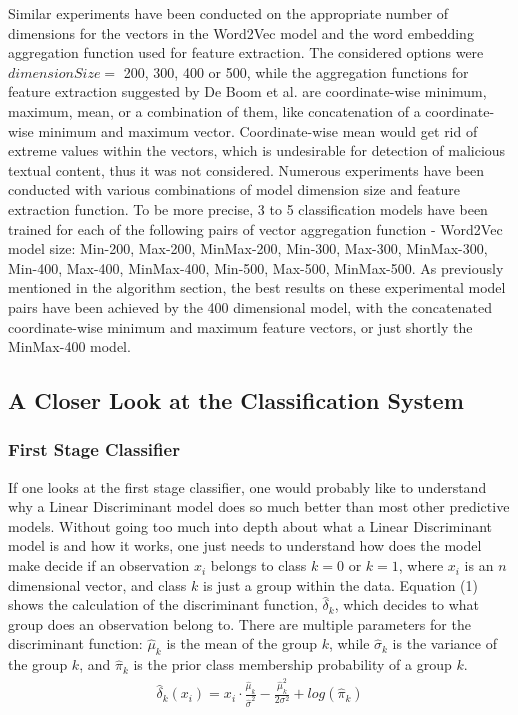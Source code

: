 \documentclass[11pt]{article}
\begin{document}
Similar experiments have been conducted on the appropriate number of dimensions for the vectors in the Word2Vec model and the word embedding aggregation function used for feature extraction. The considered options were $dimensionSize =$ 200, 300, 400 or 500, while the aggregation functions for feature extraction suggested by De Boom et al. are coordinate-wise minimum, maximum, mean, or a combination of them, like concatenation of a coordinate-wise minimum and maximum vector. Coordinate-wise mean would get rid of extreme values within the vectors, which is undesirable for detection of malicious textual content, thus it was not considered. Numerous experiments have been conducted with various combinations of model dimension size and feature extraction function. To be more precise, 3 to 5 classification models have been trained for each of the following pairs of vector aggregation function - Word2Vec model size: Min-200, Max-200, MinMax-200, Min-300, Max-300, MinMax-300, Min-400, Max-400, MinMax-400, Min-500, Max-500, MinMax-500. As previously mentioned in the algorithm section, the best results on these experimental model pairs have been achieved by the 400 dimensional model, with the concatenated coordinate-wise minimum and maximum feature vectors, or just shortly the MinMax-400 model.

\subsection{A Closer Look at the Classification System}
\subsubsection{First Stage Classifier}
If one looks at the first stage classifier, one would probably like to understand why a Linear Discriminant model does so much better than most other predictive models. Without going too much into depth about what a Linear Discriminant model is and how it works, one just needs to understand how does the model make decide if an observation $x_i$ belongs to class $k=0 $ or $k=1$, where $x_i$ is an $n$ dimensional vector, and class $k$ is just a group within the data. Equation (1) \cite{tibshirani2013introduction} shows the calculation of the discriminant function, $\hat{\delta}_{k}$, which decides to what group does an observation belong to. There are multiple parameters for the discriminant function: $\hat{\mu }_{k}$ is the mean of the group $k$, while $\hat{\sigma}_{k}$ is the variance of the group $k$, and $\hat{\pi}_{k}$ is the prior class membership probability of a group $k$.
\begin{align}
	{{\hat{\delta }}}_{{k}}\left({x_i}\right)=x_i \cdot \frac {{{\hat{\mu }}}_{{k}}}{{{\hat{\sigma }}}^{{2}}}-\frac {{{\hat{\mu}}}_{{k}}^{{2}}}{2{\sigma }^{{2}}}+{log{\left({{{\hat{\pi }}}_{{k}}}\right)}} 
\end{align}
\end{document}
